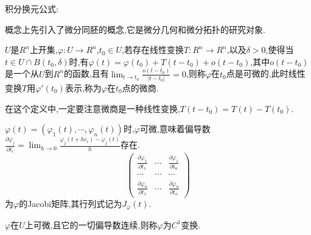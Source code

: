 \documentclass[12pt,a4paper,openany]{book}
\begin{document}
积分换元公式:

概念上先引入了微分同胚的概念,它是微分几何和微分拓扑的研究对象.

$U$是$R^n$上开集,$\varphi:U \rightarrow R^n$,$t_0 \in U$,若存在线性变换$T:R^n \rightarrow R^n$,以及$\delta>0$,使得当$t \in U \cap B(t_0,\delta)$时,有$\varphi(t)=\varphi(t_0)+T(t-t_0)+o(t-t_0)$,其中$o(t-t_0)$是一个从$U$到$R^n$的函数,且有$\lim_{t \rightarrow t_0}{\frac{o(t-t_0)}{|t-t_0|}}=0$,则称$\varphi$在$t_0$点是可微的,此时线性变换$T$用$\varphi'(t_0)$表示,称为$\varphi$在$t_0$点的微商.

在这个定义中,一定要注意微商是一种线性变换,$T(t-t_0)=T(t)-T(t_0)$.

$\varphi(t)=(\varphi_1(t),\cdots,\varphi_n(t))$时,$\varphi$可微,意味着偏导数$\frac{\partial{\varphi_j}}{\partial{t_i}}=\lim_{h \rightarrow 0}{\frac{\varphi_j(t+he_i)-\varphi_j(t)}{h}}$存在.
\[
\begin{pmatrix}
\frac{\partial{\varphi_1}}{\partial{t_1}} & \cdots & \frac{\partial{\varphi_1}}{\partial{t_n}} \\
\cdots & \cdots & \cdots \\
\frac{\partial{\varphi_n}}{\partial{t_1}} & \cdots & \frac{\partial{\varphi_n}}{\partial{t_n}}
\end{pmatrix}
\]
为$\varphi$的Jacobi矩阵,其行列式记为$J_{\varphi}(t)$.

$\varphi$在$U$上可微,且它的一切偏导数连续,则称$\varphi$为$C^1$变换.
\end{document}

